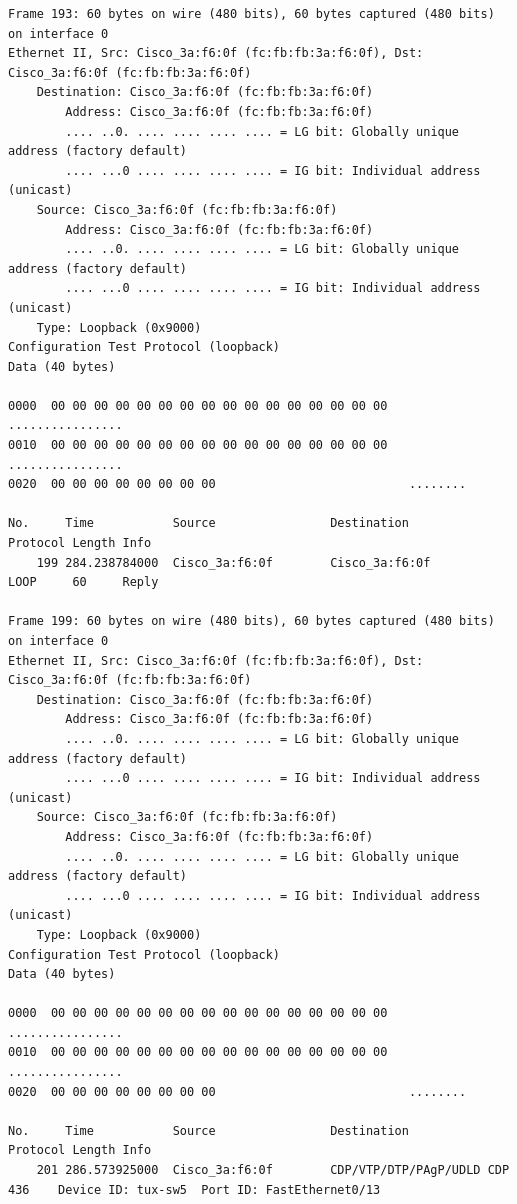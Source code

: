 \documentclass[a4paper,11pt]{article}
\begin{document}
\begin{lstlisting}
Frame 193: 60 bytes on wire (480 bits), 60 bytes captured (480 bits) on interface 0
Ethernet II, Src: Cisco_3a:f6:0f (fc:fb:fb:3a:f6:0f), Dst: Cisco_3a:f6:0f (fc:fb:fb:3a:f6:0f)
    Destination: Cisco_3a:f6:0f (fc:fb:fb:3a:f6:0f)
        Address: Cisco_3a:f6:0f (fc:fb:fb:3a:f6:0f)
        .... ..0. .... .... .... .... = LG bit: Globally unique address (factory default)
        .... ...0 .... .... .... .... = IG bit: Individual address (unicast)
    Source: Cisco_3a:f6:0f (fc:fb:fb:3a:f6:0f)
        Address: Cisco_3a:f6:0f (fc:fb:fb:3a:f6:0f)
        .... ..0. .... .... .... .... = LG bit: Globally unique address (factory default)
        .... ...0 .... .... .... .... = IG bit: Individual address (unicast)
    Type: Loopback (0x9000)
Configuration Test Protocol (loopback)
Data (40 bytes)

0000  00 00 00 00 00 00 00 00 00 00 00 00 00 00 00 00   ................
0010  00 00 00 00 00 00 00 00 00 00 00 00 00 00 00 00   ................
0020  00 00 00 00 00 00 00 00                           ........

No.     Time           Source                Destination           Protocol Length Info
    199 284.238784000  Cisco_3a:f6:0f        Cisco_3a:f6:0f        LOOP     60     Reply

Frame 199: 60 bytes on wire (480 bits), 60 bytes captured (480 bits) on interface 0
Ethernet II, Src: Cisco_3a:f6:0f (fc:fb:fb:3a:f6:0f), Dst: Cisco_3a:f6:0f (fc:fb:fb:3a:f6:0f)
    Destination: Cisco_3a:f6:0f (fc:fb:fb:3a:f6:0f)
        Address: Cisco_3a:f6:0f (fc:fb:fb:3a:f6:0f)
        .... ..0. .... .... .... .... = LG bit: Globally unique address (factory default)
        .... ...0 .... .... .... .... = IG bit: Individual address (unicast)
    Source: Cisco_3a:f6:0f (fc:fb:fb:3a:f6:0f)
        Address: Cisco_3a:f6:0f (fc:fb:fb:3a:f6:0f)
        .... ..0. .... .... .... .... = LG bit: Globally unique address (factory default)
        .... ...0 .... .... .... .... = IG bit: Individual address (unicast)
    Type: Loopback (0x9000)
Configuration Test Protocol (loopback)
Data (40 bytes)

0000  00 00 00 00 00 00 00 00 00 00 00 00 00 00 00 00   ................
0010  00 00 00 00 00 00 00 00 00 00 00 00 00 00 00 00   ................
0020  00 00 00 00 00 00 00 00                           ........

No.     Time           Source                Destination           Protocol Length Info
    201 286.573925000  Cisco_3a:f6:0f        CDP/VTP/DTP/PAgP/UDLD CDP      436    Device ID: tux-sw5  Port ID: FastEthernet0/13  


\end{lstlisting}
\end{document}
